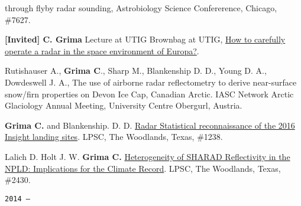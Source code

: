 \begin{etaremune}
{  through flyby radar sounding}, Astrobiology Science Confererence,
  Chicago, \#7627.
\item
  \textbf{{[}Invited{]} C. Grima} Lecture at UTIG Brownbag at UTIG,
  \href{http://www-udc.ig.utexas.edu/external/seminars/seminars/brownbag.htm}{How
  to carefully operate a radar in the space environment of Europa?}.
\item
  Rutishauser A., \textbf{Grima C}., Sharp M., Blankenship D. D., Young
  D. A., Dowdeswell J. A., The use of airborne radar reflectometry to
  derive near-surface snow/firn properties on Devon Ice Cap, Canadian
  Arctic. IASC Network Arctic Glaciology Annual Meeting, University
  Centre Obergurl, Austria.
\item
  \textbf{Grima C.} and Blankenship. D. D.
  \href{http://www.hou.usra.edu/meetings/lpsc2015/pdf/1238.pdf}{Radar
  Statistical reconnaissance of the 2016 Insight landing sites}. LPSC,
  The Woodlands, Texas, \#1238.
\item
  Lalich D. Holt J. W. \textbf{Grima C.}
  \href{http://www.hou.usra.edu/meetings/lpsc2015/pdf/2430.pdf}{Heterogeneity
  of SHARAD Reflectivity in the NPLD: Implications for the Climate
  Record}. LPSC, The Woodlands, Texas, \#2430.

\hspace{-2em}\texttt{2014 ---}


\end{etaremune}
